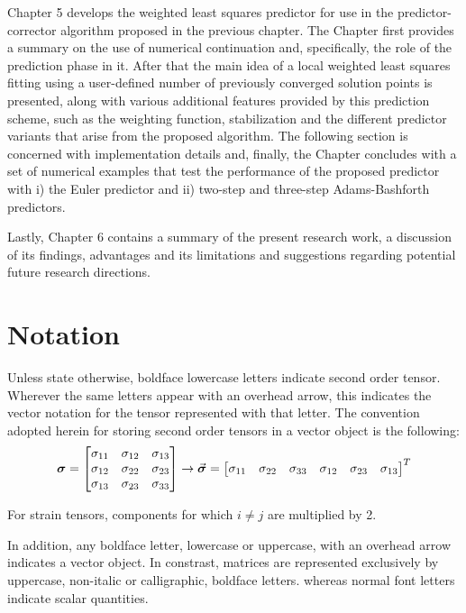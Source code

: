 Chapter 5 develops the weighted least squares predictor for use in the 
predictor-corrector algorithm proposed in the previous chapter. The Chapter first 
provides a summary on the use of numerical continuation and, specifically, the role of 
the prediction phase in it. After that the main idea of a local weighted least squares 
fitting using a user-defined number of previously converged solution points is 
presented, along with various additional features provided by this prediction scheme, 
such as the weighting function, stabilization and the different predictor variants 
that arise from the proposed algorithm. The following section is concerned with 
implementation details and, finally, the Chapter concludes with a set of numerical 
examples that test the performance of the proposed predictor with i) the Euler 
predictor and ii) two-step and three-step Adams-Bashforth predictors. 

Lastly, Chapter 6 contains a summary of the present research work, a discussion of its 
findings, advantages and its limitations and suggestions regarding potential future 
research directions.

 
\section{Notation}
Unless state otherwise, boldface lowercase letters indicate second order 
tensor. Wherever 
the same letters appear with an overhead arrow, this indicates the vector 
notation for the tensor represented with that letter. The convention adopted 
herein for storing second order tensors in a vector object is the following:
\begin{equation*}
	\boldsymbol{\sigma} = \begin{bmatrix}
		\sigma_{11} & \sigma_{12} & \sigma_{13} \\
		\sigma_{12} & \sigma_{22} & \sigma_{23} \\
		\sigma_{13} & \sigma_{23} & \sigma_{33} \\
	\end{bmatrix}\rightarrow \vec{\bm{\sigma}} = \begin{bmatrix}
		\sigma_{11} & \sigma_{22} & \sigma_{33} & \sigma_{12} & \sigma_{23} & 
		\sigma_{13}
	\end{bmatrix}^T
\end{equation*}

\noindent For strain tensors, components for which $i\neq j$ are multiplied by 2.

In addition, any boldface letter, lowercase or uppercase, with an overhead 
arrow indicates a vector object. In constrast, matrices are represented 
exclusively by uppercase, non-italic or calligraphic, boldface letters.
whereas normal font letters indicate scalar quantities. 

